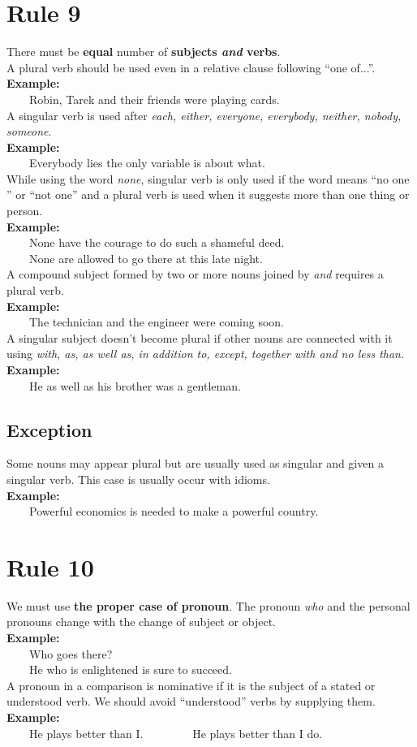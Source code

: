 \documentclass[12pt]{report}
\newcommand{\xmpl}{\textbf{Example:}\\} %
\newcommand{\indnt}{\ \ \ \ } %
\begin{document}
\section{Rule 9}
There must be \textbf{equal} number of \textbf{subjects \emph{and} verbs}.\\ 
A plural verb should be used even in a relative clause following ``one of...''.\\
\newpage
\xmpl
\indnt Robin, Tarek and their friends were playing cards.\\



A singular verb is used after \emph{each, either, everyone, everybody, neither, nobody, someone}.\\
\xmpl
\indnt Everybody lies the only variable is about what.\\ 
While using the word \emph{none}, singular verb is only used if the word means ``no one '' or ``not one'' and a plural verb is used when it suggests more than one thing or person.\\
\xmpl
\indnt None have the courage to do such a shameful deed.\\
\indnt None are allowed to go there at this late night.\\ 
A compound subject formed by two or more nouns joined by \emph{and} requires a plural verb.\\
\xmpl
\indnt The technician and the engineer were coming soon.\\ 
A singular subject doesn't become plural if other nouns are connected with it using \emph{with, as, as well as, in addition to, except, together with \emph{and} no less than.}\\
\xmpl
\indnt He as well as his brother was a gentleman.\\


\subsection{Exception}
Some nouns may appear plural but are usually used as singular and given a singular verb. This case is usually occur with idioms.\\
\textbf{Example:}\\
\indnt Powerful economics is needed to make a powerful country.


\section{Rule 10}
We must use \textbf{the proper case of pronoun}. The pronoun \textit{who} and the personal pronouns change with the change of subject or object.\\
\xmpl
\indnt Who goes there?\\
\indnt He who is enlightened is sure to succeed.\\ 
\newpage
A pronoun in a comparison is nominative if it is the subject of a stated or understood verb. We should avoid ``understood'' verbs by supplying them.
\xmpl
\indnt He plays better than I. \indnt \indnt He plays better than I do.
\end{document}

